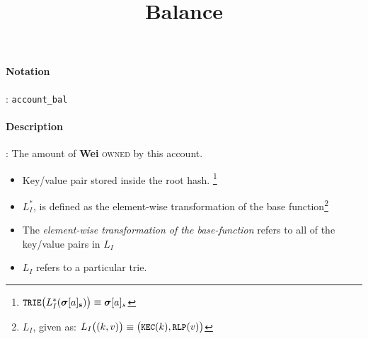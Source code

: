 \documentclass[10pt,a4paper,oneside]{scrartcl}
\author{}
\title{Balance}
\date{}
\begin{document}
\maketitle
\paragraph{Notation}: \texttt{account\_bal}
\paragraph{Description}: The amount of \textbf{Wei} \textsc{owned} by this account.
    \begin{itemize}
        \item Key/value pair stored inside the root hash. \footnote{$\texttt{\small TRIE}\big(L_I^*(\boldsymbol{\sigma}[a]_\mathbf{s})\big) \equiv \boldsymbol{\sigma}[a]_s$}
        \item $L_I^*$, is defined as the element-wise transformation of the base function\footnote{$L_I$, given as: $L_I\big( (k, v) \big) \equiv \big(\texttt{\small KEC}(k
), \texttt{\small RLP}(v)\big)$}
        \item The \textsl{element-wise transformation of the base-function} refers to all of the key/value pairs in \textit{$L_I$}
        \item $L_I$ refers to a particular \gls{trie}.
    \end{itemize}
\end{document}
